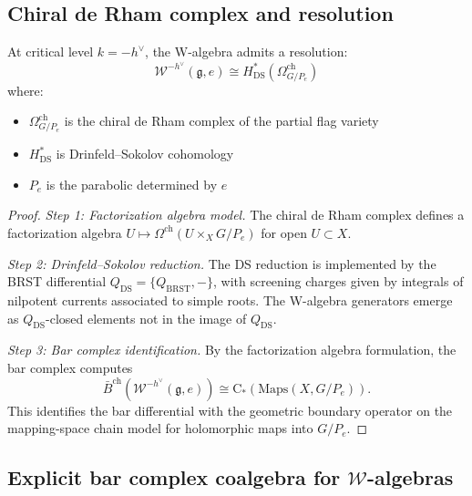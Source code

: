 \subsection{Chiral de Rham complex and resolution}

\begin{theorem}\label{thm:w-cdr}
At critical level $k = -h^\vee$, the W-algebra admits a resolution:
\[
\mathcal{W}^{-h^\vee}(\mathfrak{g}, e) \cong H^*_{\mathrm{DS}}(\Omega^{\mathrm{ch}}_{G/P_e})
\]
where:
\begin{itemize}
\item $\Omega^{\mathrm{ch}}_{G/P_e}$ is the chiral de Rham complex of the partial flag variety
\item $H^*_{\mathrm{DS}}$ is Drinfeld--Sokolov cohomology
\item $P_e$ is the parabolic determined by $e$
\end{itemize}
\end{theorem}

\begin{proof}
\emph{Step 1: Factorization algebra model.} The chiral de Rham complex defines a factorization algebra $U \mapsto \Omega^{\mathrm{ch}}(U \times_{X} G/P_e)$ for open $U \subset X$.

\emph{Step 2: Drinfeld--Sokolov reduction.} The DS reduction is implemented by the BRST differential $Q_{\mathrm{DS}} = \{Q_{\mathrm{BRST}}, -\}$, with screening charges given by integrals of nilpotent currents associated to simple roots. The W-algebra generators emerge as $Q_{\mathrm{DS}}$-closed elements not in the image of $Q_{\mathrm{DS}}$.

\emph{Step 3: Bar complex identification.} By the factorization algebra
formulation, the bar complex computes
\[
\bar{B}^{\mathrm{ch}}(\mathcal{W}^{-h^\vee}(\mathfrak{g}, e))
\cong \mathrm{C}_*(\mathrm{Maps}(X, G/P_e)).
\]
This identifies the bar differential with the geometric boundary operator on
the mapping-space chain model for holomorphic maps into $G/P_e$.
\end{proof}

\subsection{Explicit bar complex coalgebra for $\mathcal{W}$-algebras}

